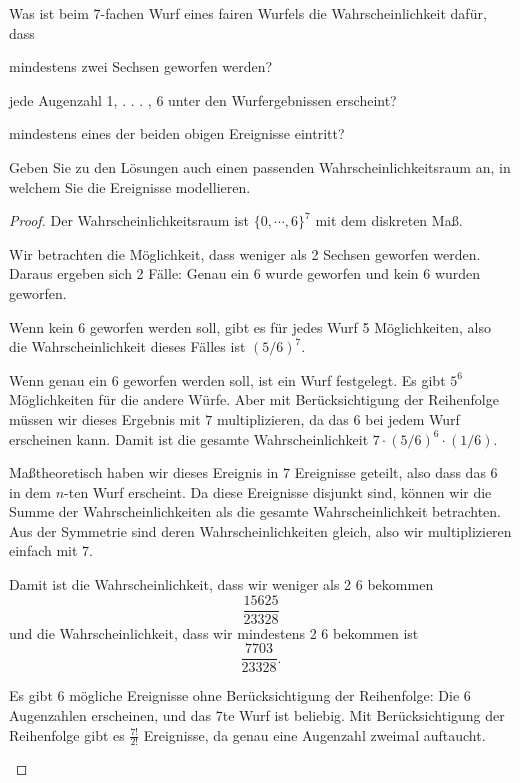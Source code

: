 \begin{Problem}
	Was ist beim 7-fachen Wurf eines fairen Wurfels die Wahrscheinlichkeit daf\"{u}r, dass	
\begin{parts}
\item mindestens zwei Sechsen geworfen werden?
\item jede Augenzahl 1, . . . , 6 unter den Wurfergebnissen erscheint?
\item mindestens eines der beiden obigen Ereignisse eintritt?
\end{parts}
Geben Sie zu den L\"{o}sungen auch einen passenden Wahrscheinlichkeitsraum an, in welchem Sie die Ereignisse modellieren.
\end{Problem}
\begin{proof}
	Der Wahrscheinlichkeitsraum ist $\{0,\cdots, 6\}^7$ mit dem diskreten Maß.
	\begin{parts}
	\item Wir betrachten die Möglichkeit, dass weniger als 2 Sechsen geworfen werden. Daraus ergeben sich 2 Fälle: Genau ein $6$ wurde geworfen und kein $6$ wurden geworfen. 

		Wenn kein $6$ geworfen werden soll, gibt es für jedes Wurf 5 Möglichkeiten, also die Wahrscheinlichkeit dieses Fälles ist $(5 / 6)^7$.

		Wenn genau ein $6$ geworfen werden soll, ist ein Wurf festgelegt. Es gibt $5^6$ Möglichkeiten für die andere Würfe. Aber mit Berücksichtigung der Reihenfolge müssen wir dieses Ergebnis mit $7$ multiplizieren, da das $6$ bei jedem Wurf erscheinen kann. Damit ist die gesamte Wahrscheinlichkeit $7\cdot (5 / 6)^6 \cdot (1 / 6)$.

		Maßtheoretisch haben wir dieses Ereignis in $7$ Ereignisse geteilt, also dass das $6$ in dem $n$-ten Wurf erscheint. Da diese Ereignisse disjunkt sind, können wir die Summe der Wahrscheinlichkeiten als die gesamte Wahrscheinlichkeit betrachten. Aus der Symmetrie sind deren Wahrscheinlichkeiten gleich, also wir multiplizieren einfach mit $7$. 
	
Damit ist die Wahrscheinlichkeit, dass wir weniger als 2 $6$ bekommen
\[\frac{15625}{23328}\]
und die Wahrscheinlichkeit, dass wir mindestens 2 $6$ bekommen ist
\[
\frac{7703}{23328}
.\] 
\item Es gibt $6$ mögliche Ereignisse ohne Berücksichtigung der Reihenfolge: Die $6$ Augenzahlen erscheinen, und das 7te Wurf ist beliebig. Mit Berücksichtigung der Reihenfolge gibt es $\frac{7!}{2!}$ Ereignisse, da genau eine Augenzahl zweimal auftaucht.


\end{parts}
\end{proof}
